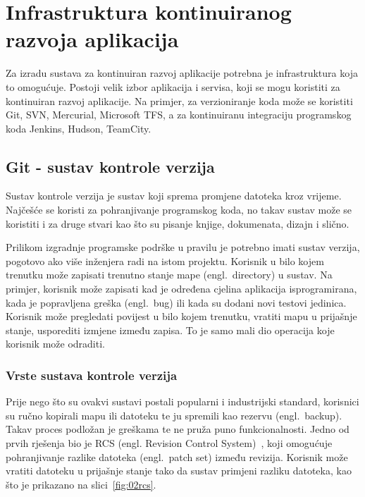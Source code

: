 \chapter{Infrastruktura kontinuiranog razvoja aplikacija}
Za izradu sustava za kontinuiran razvoj aplikacije potrebna je infrastruktura koja to omogućuje.
Postoji velik izbor aplikacija i servisa, koji se mogu koristiti za kontinuiran razvoj aplikacije.
Na primjer, za verzioniranje koda može se koristiti Git, SVN, Mercurial, Microsoft TFS, a za
kontinuiranu integraciju programskog koda Jenkins, Hudson, TeamCity.

\section{Git - sustav kontrole verzija}
Sustav kontrole verzija je sustav koji sprema promjene datoteka kroz vrijeme. Najčešće se koristi za
pohranjivanje programskog koda, no takav sustav može se koristiti i za druge stvari kao što su
pisanje knjige, dokumenata, dizajn i slično.

Prilikom izgradnje programske podrške u pravilu je potrebno imati sustav verzija, pogotovo ako više
inženjera radi na istom projektu. Korisnik u bilo kojem trenutku može zapisati trenutno stanje
mape (engl.~directory) u sustav. Na primjer, korisnik može zapisati kad je određena cjelina
aplikacija isprogramirana, kada je popravljena greška (engl.~bug) ili kada su dodani novi testovi
jedinica. Korisnik može pregledati povijest u bilo kojem trenutku, vratiti mapu u prijašnje stanje,
usporediti izmjene između zapisa. To je samo mali dio operacija koje korisnik može odraditi.

\subsection{Vrste sustava kontrole verzija}
Prije nego što su ovakvi sustavi postali popularni i industrijski standard, korisnici su ručno
kopirali mapu ili datoteku te ju spremili kao rezervu (engl.~backup). Takav proces podložan je
greškama te ne pruža puno funkcionalnosti. Jedno od prvih rješenja bio je RCS (engl. Revision
Control System)~\citep{chacon2014pro}, koji omogućuje pohranjivanje razlike datoteka (engl.~patch
set) između revizija. Korisnik može vratiti datoteku u prijašnje stanje tako da sustav primjeni
razliku datoteka, kao što
je prikazano na slici~\ref{fig:02rcs}.

